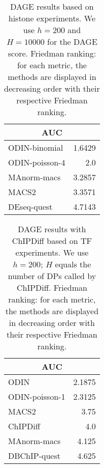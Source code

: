 \begin{table}[h!]
\begin{center}
\renewcommand{\arraystretch}{1.2}
  \begin{tabular}{ |lr| }
    \hline
    \multicolumn{2}{|c|}{\textbf{AUC}} \\
    \hline
    ODIN-binomial & 1.6429 \\
    ODIN-poisson-4 & 2.0 \\
    MAnorm-macs & 3.2857 \\
    MACS2 & 3.3571 \\
    DEseq-quest & 4.7143 \\
    \hline
  \end{tabular}
\end{center}
\caption[Friedman ranking of DAGE results for histone experiments]{DAGE results based on histone experiments. We use $h=200$ and $H=10000$ for the DAGE score. Friedman ranking: for each metric, the methods are displayed in decreasing order with their respective Friedman ranking.}
\label{tab_dage_hist}
\end{table}






\begin{table}[h!]
\begin{center}
\renewcommand{\arraystretch}{1.2}
  \begin{tabular}{ |lr| }
    \hline
    \multicolumn{2}{|c|}{\textbf{AUC}} \\
    \hline
    ODIN & 2.1875 \\
    ODIN-poisson-1 & 2.3125 \\
    MACS2 & 3.75 \\
    ChIPDiff & 4.0 \\
    MAnorm-macs & 4.125 \\
    DBChIP-quest & 4.625 \\
    \hline
  \end{tabular}
\end{center}
\caption[Friedman ranking of DAGE results with ChIPDiff for TF experiments]{DAGE results with ChIPDiff based on TF experiments. We use $h=200$; $H$ equals the number of DPs called by ChIPDiff. Friedman ranking: for each metric, the methods are displayed in decreasing order with their respective Friedman ranking.}
\label{tab_dagechipdiff_tf}
\end{table}


